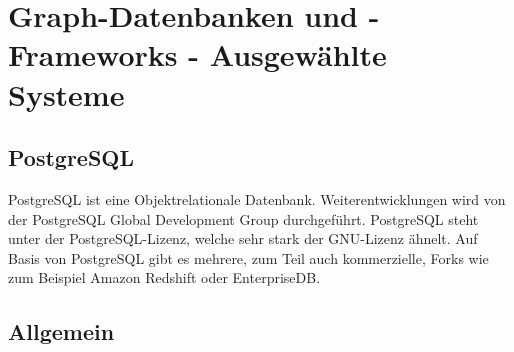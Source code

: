 \chapter{Graph-Datenbanken und -Frameworks - Ausgewählte Systeme }
\section{PostgreSQL}
PostgreSQL ist eine Objektrelationale Datenbank. Weiterentwicklungen wird von der PostgreSQL Global Development Group durchgeführt. PostgreSQL steht unter der PostgreSQL-Lizenz, welche sehr stark der GNU-Lizenz ähnelt. Auf Basis von PostgreSQL gibt es mehrere, zum Teil auch kommerzielle, Forks wie zum Beispiel Amazon Redshift oder EnterpriseDB.
\section{Allgemein}
\newpage
